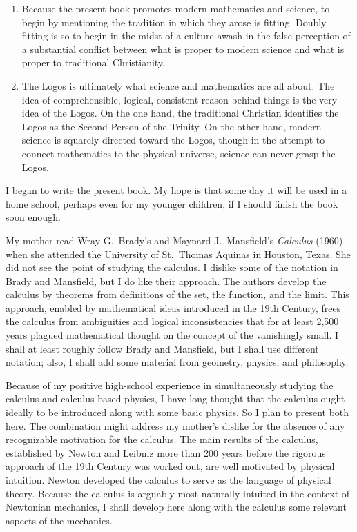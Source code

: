 {\begin{enumerate}
      \item Because the present book promotes modern mathematics and science,
         to begin by mentioning the tradition in which they arose is fitting.
         Doubly fitting is so to begin in the midst of a culture awash in the
         false perception of a substantial conflict between what is proper to
         modern science and what is proper to traditional Christianity.
      \item The Logos is ultimately what science and mathematics are all about.
         The idea of comprehensible, logical, consistent reason behind things
         is the very idea of the Logos. On the one hand, the traditional
         Christian identifies the Logos as the Second Person of the Trinity.
         On the other hand, modern science is squarely directed toward the
         Logos, though in the attempt to connect mathematics to the physical
         universe, science can never grasp the Logos.
   \end{enumerate}
}
I began to write the present book. My hope is that some day it will be used in
a home school, perhaps even for my younger children, if I should finish the
book soon enough.

My mother read Wray G.~Brady's and Maynard J.~Mansfield's {\it Calculus\/}
(1960) when she attended the University of St.~Thomas Aquinas in Houston,
Texas.  She did not see the point of studying the calculus.  I dislike some of
the notation in Brady and Mansfield, but I do like their approach. The authors
develop the calculus by theorems from definitions of the set, the function, and
the limit.  This approach, enabled by mathematical ideas introduced in the 19th
Century, frees the calculus from ambiguities and logical inconsistencies that
for at least 2,500 years plagued mathematical thought on the concept of the
vanishingly small. I shall at least roughly follow Brady and Mansfield, but I
shall use different notation; also, I shall add some material from geometry,
physics, and philosophy.

Because of my positive high-school experience in simultaneously studying the
calculus and calculus-based physics, I have long thought that the calculus
ought ideally to be introduced along with some basic physics.  So I plan to
present both here. The combination might address my mother's dislike for the
absence of any recognizable motivation for the calculus.  The main results of
the calculus, established by Newton and Leibniz more than 200 years before the
rigorous approach of the 19th Century was worked out, are well motivated by
physical intuition.  Newton developed the calculus to serve as the language of
physical theory.  Because the calculus is arguably most naturally intuited in
the context of Newtonian mechanics, I shall develop here along with the
calculus some relevant aspects of the mechanics.


